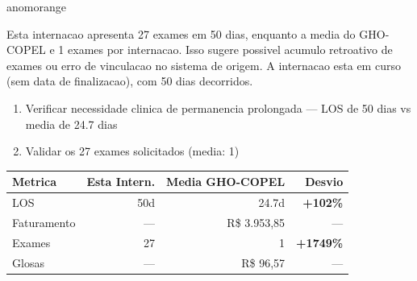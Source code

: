 \documentclass[a4paper,10pt]{article}
\begin{document}
\begin{anomalycard}[Internacao 673 | GHO-COPEL | ALTO (z=4.29)]{anomorange}
\vspace{2pt}\begin{tcolorbox}[colback=severityred!20,colframe=anomorange,title={\textbf{Interpretacao de Negocio}},fonttitle=\bfseries\small,left=4pt,right=4pt,top=3pt,bottom=3pt]
{\small Esta internacao apresenta 27 exames em 50 dias, enquanto a media do GHO-COPEL e 1 exames por internacao. Isso sugere possivel acumulo retroativo de exames ou erro de vinculacao no sistema de origem. A internacao esta em curso (sem data de finalizacao), com 50 dias decorridos.}
\end{tcolorbox}
\begin{tcolorbox}[colback=severityyellow!30,colframe=anomorange,title={\textbf{Recomendacoes Especificas}},fonttitle=\bfseries\small,left=4pt,right=4pt,top=3pt,bottom=3pt]
\begin{enumerate}[nosep,leftmargin=16pt]
\item {\small Verificar necessidade clinica de permanencia prolongada --- LOS de 50 dias vs media de 24.7 dias}
\item {\small Validar os 27 exames solicitados (media: 1)}
\end{enumerate}
\end{tcolorbox}
\begin{center}\begin{tabular}{l r r r}\toprule\textbf{Metrica} & \textbf{Esta Intern.} & \textbf{Media GHO-COPEL} & \textbf{Desvio} \\\midrule
LOS & 50d & 24.7d & \textcolor{anomred}{\textbf{+102\%}} \\
Faturamento & --- & R\$ 3.953,85 & --- \\
Exames & 27 & 1 & \textcolor{anomred}{\textbf{+1749\%}} \\
Glosas & --- & R\$ 96,57 & --- \\
\bottomrule\end{tabular}\end{center}


\end{anomalycard}
\end{document}
